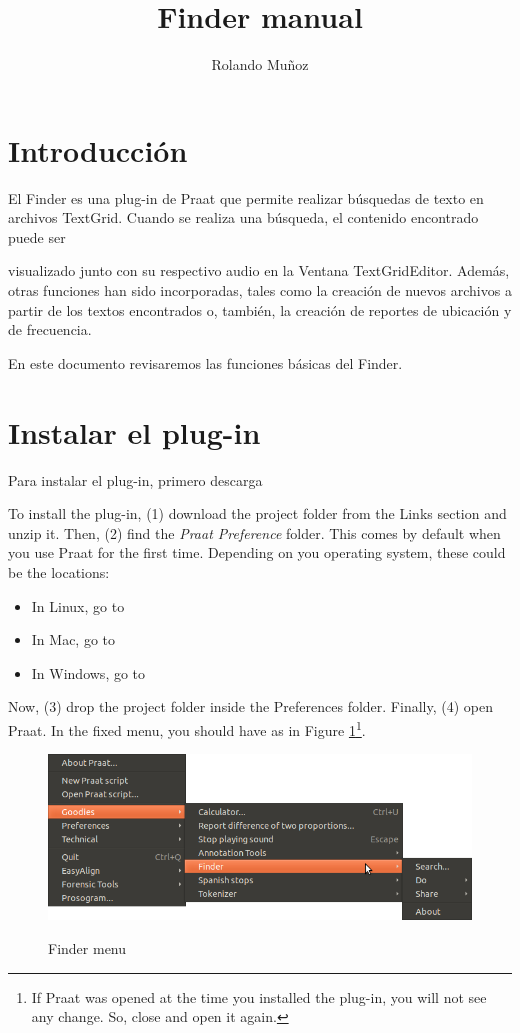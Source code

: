 \documentclass[10pt,a4paper]{article}
\author{Rolando Muñoz}
\title{Finder manual}
\begin{document}
\maketitle

\section{Introducción}
El Finder es una plug-in de Praat que permite realizar búsquedas de texto en archivos TextGrid. Cuando se realiza una búsqueda, el contenido encontrado puede ser 

visualizado junto con su respectivo audio en la Ventana TextGridEditor. Además, otras funciones han sido incorporadas, tales como la creación de nuevos archivos a partir de los textos encontrados o, también, la creación de reportes de ubicación y de frecuencia. 

En este documento revisaremos las funciones básicas del Finder.

\section{Instalar el plug-in}
Para instalar el plug-in, primero descarga 

To install the plug-in, (1) download the project folder from the Links section and unzip it. Then, (2) find the \textit{Praat Preference} folder. This comes by default when you use Praat for the first time. Depending on you operating system, these could be the locations:

\begin{itemize}
	\item In Linux, go to 
	\item In Mac, go to 
	\item In Windows, go to 
\end{itemize}

Now, (3) drop the project folder inside the Preferences folder. Finally, (4) open Praat. In the fixed menu, you should have  as in Figure {\tiny }\ref{fig:finder_menu}\footnote{If Praat was opened at the time you installed the plug-in, you will not see any change. So, close and open it again.}.

\begin{figure}
	\centering
	\includegraphics[scale=0.5]{img/004}
	\label{fig:finder_menu}
	\caption{Finder menu}
\end{figure}
\end{document}
